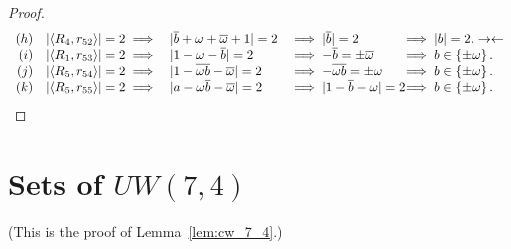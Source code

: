 \begin{lemma}
\begin{proof}
$$\begin{array}{rcll@{\hspace{-0.08cm}}l}
      (h) & \unb4{52} \implies & |\bar{b}+\omega+\bar{\omega}+1|=2       &\implies |\bar{b}|=2            &\implies |b| = 2.   \con \\
      (i) & \unb1{53} \implies & |1-\omega-\bar{b}|=2               &\implies -\bar{b} = \pm\bar{\omega}  &\implies b \in \left\{ \pm\omega\right\}.       \\
      (j) & \unb5{54} \implies & |1-\overline{\omega b}-\bar{\omega}|=2   &\implies -\overline{\omega b}=\pm\omega   &\implies b \in \left\{ \pm\omega\right\}.       \\
      (k) & \unb5{55} \implies & |a-\omega\bar{b}-\bar{\omega}|=2        &\implies |1-\bar{b}-\omega|=2        &\implies b \in \left\{ \pm\omega\right\}.
     \end{array}
     $$

 \end{proof}
\end{lemma}



\section[Sets of \texorpdfstring{$UW(7,4)$}{UW(7,4)}]{Sets of \texorpdfstring{$UW(7,4)$}{UW(7,4)}}
\label{app:uw74}

(This is the proof of Lemma~\ref{lem:cw_7_4}.)

